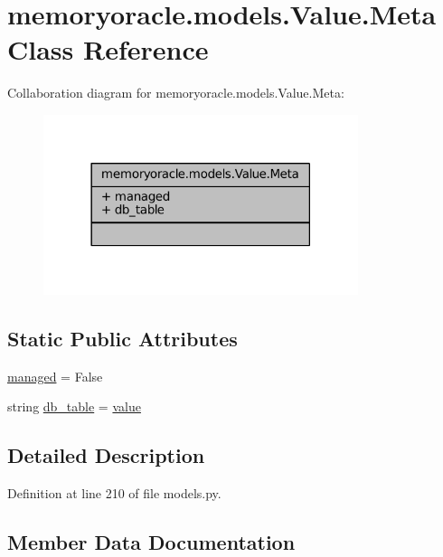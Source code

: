 \hypertarget{classmemoryoracle_1_1models_1_1Value_1_1Meta}{}\section{memoryoracle.\+models.\+Value.\+Meta Class Reference}
\label{classmemoryoracle_1_1models_1_1Value_1_1Meta}


Collaboration diagram for memoryoracle.\+models.\+Value.\+Meta\+:\nopagebreak
\begin{figure}[H]
\begin{center}
\leavevmode
\includegraphics[width=261pt]{classmemoryoracle_1_1models_1_1Value_1_1Meta__coll__graph}
\end{center}
\end{figure}
\subsection*{Static Public Attributes}
\begin{DoxyCompactItemize}
\item 
\hyperlink{classmemoryoracle_1_1models_1_1Value_1_1Meta_a49f47f6a393f109c8a1e0d3f648b3858}{managed} = False
\item 
string \hyperlink{classmemoryoracle_1_1models_1_1Value_1_1Meta_a6f22428ba16f59670b72f655f8e18c3c}{db\+\_\+table} = \textquotesingle{}\hyperlink{classmemoryoracle_1_1models_1_1Value_a7f23da89c776a06cd9c84754ac455295}{value}\textquotesingle{}
\end{DoxyCompactItemize}


\subsection{Detailed Description}


Definition at line 210 of file models.\+py.



\subsection{Member Data Documentation}
\hypertarget{classmemoryoracle_1_1models_1_1Value_1_1Meta_a6f22428ba16f59670b72f655f8e18c3c}{}
